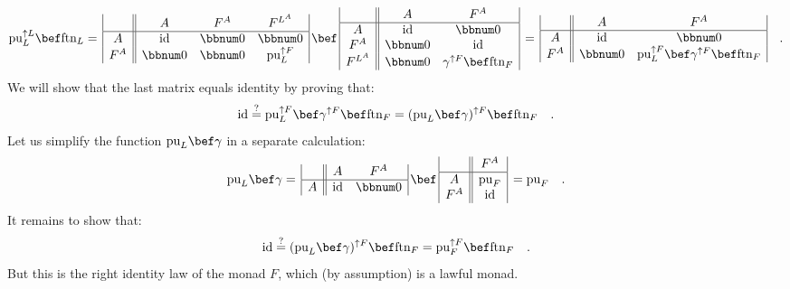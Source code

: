 \[
\text{pu}_{L}^{\uparrow L}\bef\text{ftn}_{L}=\,\begin{array}{|c||ccc|}
 & A & F^{A} & F^{L^{A}}\\
\hline A & \text{id} & \bbnum 0 & \bbnum 0\\
F^{A} & \bbnum 0 & \bbnum 0 & \text{pu}_{L}^{\uparrow F}
\end{array}\,\bef\,\begin{array}{|c||cc|}
 & A & F^{A}\\
\hline A & \text{id} & \bbnum 0\\
F^{A} & \bbnum 0 & \text{id}\\
F^{L^{A}} & \bbnum 0 & \gamma^{\uparrow F}\bef\text{ftn}_{F}
\end{array}\,=\,\begin{array}{|c||cc|}
 & A & F^{A}\\
\hline A & \text{id} & \bbnum 0\\
F^{A} & \bbnum 0 & \text{pu}_{L}^{\uparrow F}\bef\gamma^{\uparrow F}\bef\text{ftn}_{F}
\end{array}\quad.
\]
We will show that the last matrix equals identity by proving that:
\[
\text{id}\overset{?}{=}\text{pu}_{L}^{\uparrow F}\bef\gamma^{\uparrow F}\bef\text{ftn}_{F}=(\text{pu}_{L}\bef\gamma)^{\uparrow F}\bef\text{ftn}_{F}\quad.
\]
Let us simplify the function $\text{pu}_{L}\bef\gamma$ in a separate
calculation:
\[
\text{pu}_{L}\bef\gamma=\,\begin{array}{|c||cc|}
 & A & F^{A}\\
\hline A & \text{id} & \bbnum 0
\end{array}\,\bef\,\begin{array}{|c||c|}
 & F^{A}\\
\hline A & \text{pu}_{F}\\
F^{A} & \text{id}
\end{array}\,=\text{pu}_{F}\quad.
\]
It remains to show that:
\[
\text{id}\overset{?}{=}(\text{pu}_{L}\bef\gamma)^{\uparrow F}\bef\text{ftn}_{F}=\text{pu}_{F}^{\uparrow F}\bef\text{ftn}_{F}\quad.
\]
But this is the right identity law of the monad $F$, which (by assumption)
is a lawful monad. 

